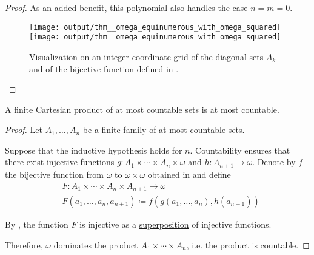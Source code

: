 \begin{proof}
  As an added benefit, this polynomial also handles the case \( n = m = 0 \).

  \begin{figure}[!ht]
    \hfill
    \texttt{[image: output/thm\_\_omega\_equinumerous\_with\_omega\_squared]}
    \hfill
    \texttt{[image: output/thm\_\_omega\_equinumerous\_with\_omega\_squared]}
    \hfill\hfill
    \caption{Visualization on an integer coordinate grid of the diagonal sets \( A_k \) and of the bijective function defined in .}\label{fig:thm:omega_equinumerous_with_omega_squared}
  \end{figure}
\end{proof}

\begin{corollary}\label{thm:countable_product_of_countable_sets}
  A finite \hyperref[def:cartesian_product]{Cartesian product} of at most countable sets is at most countable.
\end{corollary}
\begin{proof}
  Let \( A_1, \ldots, A_n \) be a finite family of at most countable sets.

  Suppose that the inductive hypothesis holds for \( n \). Countability ensures that there exist injective functions \( g: A_1 \times \cdots \times A_n \times \omega \) and \( h: A_{n+1} \to \omega \). Denote by \( f \) the bijective function from \( \omega \) to \( \omega \times \omega \) obtained in  and define
  \begin{equation*}
    \begin{aligned}
      &F: A_1 \times \cdots \times A_n \times A_{n+1} \to \omega \\
      &F(a_1, \ldots, a_n, a_{n+1}) \coloneqq f(g(a_1, \ldots, a_n), h(a_{n+1}))
    \end{aligned}
  \end{equation*}

  By , the function \( F \) is injective as a \hyperref[rem:function_superposition]{superposition} of injective functions.

  Therefore, \( \omega \) dominates the product \( A_1 \times \cdots \times A_n \), i.e. the product is countable.
\end{proof}

